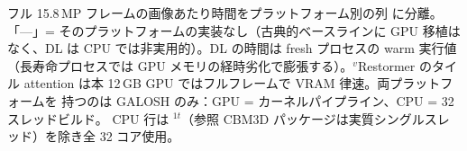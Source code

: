 \begin{table}[t]
\vspace{2pt}
{\footnotesize フル 15.8\,MP フレームの画像あたり時間をプラットフォーム別の列
に分離。「---」= そのプラットフォームの実装なし（古典的ベースラインに GPU 移植は
なく、DL は CPU では非実用的）。DL の時間は fresh プロセスの warm 実行値
（長寿命プロセスでは GPU メモリの経時劣化で膨張する）。$^{v}$Restormer のタイル
attention は本 12\,GB GPU ではフルフレームで VRAM 律速。両プラットフォームを
持つのは GALOSH のみ：GPU = カーネルパイプライン、CPU = 32 スレッドビルド。
CPU 行は $^{1t}$（参照 CBM3D パッケージは実質シングルスレッド）を除き全 32
コア使用。}
\end{table}

\begin{table}[t]
\centering
\caption{\textbf{RawNIND レンダリング sRGB}（カメラ横断 $512^2$ クロップ全
1493 枚）における sRGB 領域ブラインド・デノイジング。プロトコルと強調は
表~\ref{tab:sidd_srgb} と同じ。本セットは低 ISO シーンが支配的（1493 中 684 が
ISO\,2000 未満）で、集計値がノイズ入力側へ圧縮される --- ISO 帯別の内訳は
表~\ref{tab:rawnind_srgb_iso} を参照。}
\label{tab:rawnind_srgb}
\setlength{\tabcolsep}{2pt}
\footnotesize
{}


\end{table}
